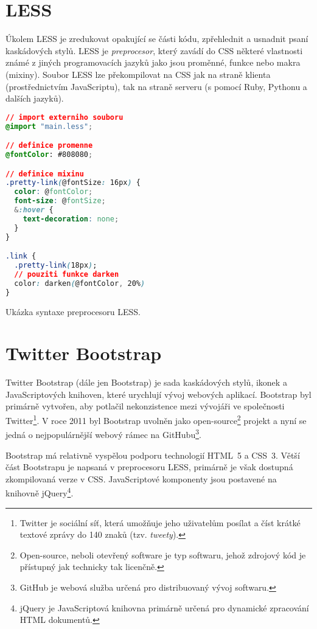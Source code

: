 \section{LESS}
\label{sec:less}

Úkolem LESS je zredukovat opakující se části kódu, zpřehlednit a usnadnit psaní kaskádových stylů. LESS je \textit{preprocesor}, který zavádí do CSS některé vlastnosti známé z jiných programovacích jazyků jako jsou proměnné, funkce nebo makra (mixiny). Soubor LESS lze překompilovat na CSS jak na straně klienta (prostřednictvím JavaScriptu), tak na straně serveru (s pomocí Ruby, Pythonu a dalších jazyků).

\begin{example}
    \centering
    \begin{lstlisting}[language=css]
// import externiho souboru
@import "main.less";

// definice promenne
@fontColor: #808080;

// definice mixinu
.pretty-link(@fontSize: 16px) {
  color: @fontColor;
  font-size: @fontSize;
  &:hover {
    text-decoration: none;
  }
}

.link {
  .pretty-link(18px);
  // pouziti funkce darken
  color: darken(@fontColor, 20%)
}
    \end{lstlisting}
    \caption{Ukázka syntaxe preprocesoru LESS.}
    \label{example:less-css}
\end{example}

\section{Twitter Bootstrap}
\label{sec:bootstrap}

Twitter Bootstrap (dále jen Bootstrap) je sada kaskádových stylů, ikonek a JavaScriptových knihoven, které urychlují vývoj webových aplikací. Bootstrap byl primárně vytvořen, aby potlačil nekonzistence mezi vývojáři ve společnosti Twitter\footnote{Twitter je sociální síť, která umožňuje jeho uživatelům posílat a číst krátké textové zprávy do 140 znaků (tzv. \textit{tweety}).}. V roce 2011 byl Bootstrap uvolněn jako open-source\footnote{Open-source, neboli otevřený software je typ softwaru, jehož zdrojový kód je přístupný jak technicky tak licenčně.} projekt a nyní se jedná o nejpopulárnější webový rámec na GitHubu\footnote{GitHub je webová služba určená pro distribuovaný vývoj softwaru.}.

Bootstrap má relativně vyspělou podporu technologií HTML~5 a CSS~3. Větší část Bootstrapu je napsaná v preprocesoru LESS, primárně je však dostupná zkompilovaná verze v CSS. JavaScriptové komponenty jsou postavené na knihovně jQuery\footnote{jQuery je JavaScriptová knihovna primárně určená pro dynamické zpracování HTML dokumentů.}.

